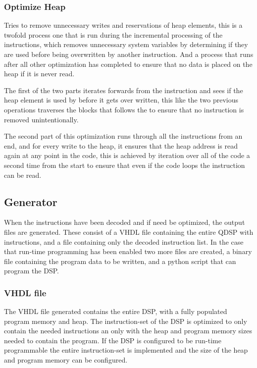 

\subsubsection{Optimize Heap}
Tries to remove unnecessary writes and reservations of heap elements, this is a twofold process one that is run during the incremental processing of the instructions, which removes unnecessary system variables by determining if they are used before being overwritten by another instruction. And a process that runs after all other optimization has completed to ensure that no data is placed on the heap if it is never read.

The first of the two parts iterates forwards from the instruction and sees if the heap element is used by before it gets over written, this like the two previous operations traverses the blocks that follows the to ensure that no instruction is removed unintentionally.

The second part of this optimization runs through all the instructions from an end, and for every write to the heap, it ensures that the heap address is read again at any point in the code, this is achieved by iteration over all of the code a second time from the start to ensure that even if the code loops the instruction can be read.


\subsection{Generator}
When the instructions have been decoded and if need be optimized, the output files are generated. These consist of a VHDL file containing the entire QDSP with instructions, and a file containing only the decoded instruction list. In the case that run-time programming has been enabled two more files are created, a binary file containing the program data to be written, and a python script that can program the DSP. 

\subsubsection{VHDL file}
The VHDL file generated contains the entire DSP, with a fully populated program memory and heap. The instruction-set of the DSP is optimized to only contain the needed instructions an only with the heap and program memory sizes needed to contain the program. If the DSP is configured to be run-time programmable the entire instruction-set is implemented and the size of the heap and program memory can be configured.

